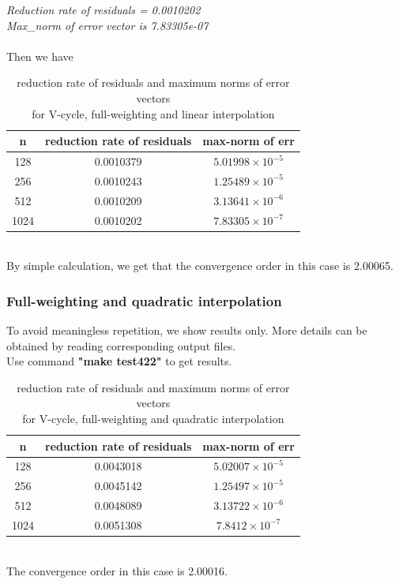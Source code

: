 \documentclass[a4paper,twocolumn]{article}
\theoremstyle{definition}
\begin{document}
\noindent \emph{Reduction rate of residuals = 0.0010202}\\
\emph{Max\_norm of error vector is 7.83305e-07}\\\\
Then we have
\begin{table}[!htp]
	\centering
	\begin{tabular}{|c|c|c|}
		\hline	
		n & reduction rate of residuals &max-norm of err  \\
		\hline		
		128 &0.0010379& $5.01998\times 10^{-5}$ \\
		\hline		
		256 &0.0010243& $1.25489\times 10^{-5}$ \\
		\hline		
		512 &0.0010209& $3.13641\times 10^{-6}$ \\
		\hline		
		1024 &0.0010202& $7.83305\times 10^{-7}$ \\
		\hline
	\end{tabular}
	\caption{reduction rate of residuals and maximum norms of error vectors \\for V-cycle, full-weighting and linear interpolation}
\end{table}\\
\newpage
\noindent By simple calculation, we get that the convergence order in this case is 2.00065.
\subsubsection{Full-weighting and quadratic interpolation}
To avoid meaningless repetition, we show results only. More details can be obtained by reading corresponding output files.\\
Use command \textbf{"make test422"} to get results. 
\begin{table}[!htp]
	\centering
	\begin{tabular}{|c|c|c|}
		\hline	
		n & reduction rate of residuals & max-norm of err  \\
		\hline		
		128 &0.0043018 & $5.02007\times 10^{-5}$ \\
		\hline		
		256 &0.0045142 & $1.25497\times 10^{-5}$ \\
		\hline		
		512 &0.0048089 & $3.13722\times 10^{-6}$ \\
		\hline		
		1024 &0.0051308 & $7.8412\times 10^{-7}$ \\
		\hline
	\end{tabular}
	\caption{reduction rate of residuals and maximum norms of error vectors \\for V-cycle, full-weighting and quadratic interpolation}
\end{table}\\
The convergence order in this case is 2.00016.
\end{document}
